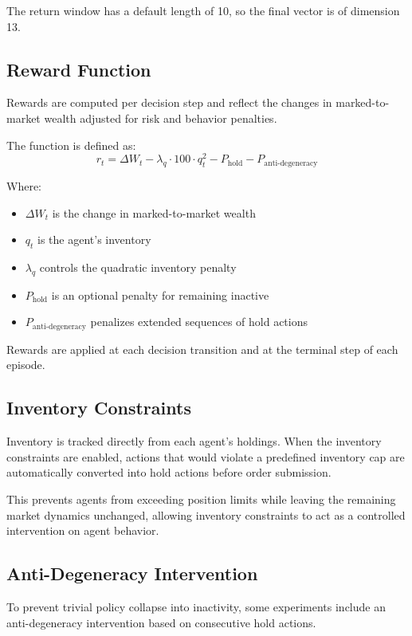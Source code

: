 \documentclass[sigconf]{acmart}
\begin{document}
The return window has a default length of 10, so the final vector is of dimension 13.

\subsection{Reward Function}

Rewards are computed per decision step and reflect the changes in marked-to-market wealth adjusted for risk and behavior penalties.

The function is defined as:
\[
r_t = \Delta W_t - \lambda_q \cdot 100 \cdot q_t^2 - P_{\text{hold}} - P_{\text{anti-degeneracy}}
\]

Where:
\begin{itemize}[leftmargin=1.5em]
    \item $\Delta W_t$ is the change in marked-to-market wealth
    \item $q_t$ is the agent's inventory
    \item $\lambda_q$ controls the quadratic inventory penalty
    \item $P_{\text{hold}}$ is an optional penalty for remaining inactive
    \item $P_{\text{anti-degeneracy}}$ penalizes extended sequences of hold actions
\end{itemize}

Rewards are applied at each decision transition and at the terminal step of each episode.

\subsection{Inventory Constraints}

Inventory is tracked directly from each agent's holdings. When the inventory constraints are enabled, actions that would violate a predefined inventory cap are automatically converted into hold actions before order submission.

This prevents agents from exceeding position limits while leaving the remaining market dynamics unchanged, allowing inventory constraints to act as a controlled intervention on agent behavior.

\subsection{Anti-Degeneracy Intervention}

To prevent trivial policy collapse into inactivity, some experiments include an anti-degeneracy intervention based on consecutive hold actions.
\end{document}
